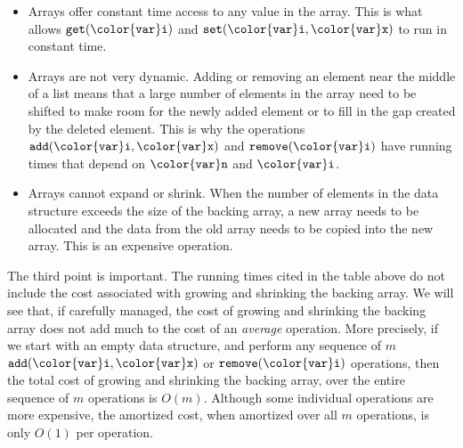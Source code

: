 \documentclass[10pt]{book}
\newcommand{\cpponly}[1]{}\newcommand{\javaonly}[1]{#1}\newcommand{\pcodeonly}[1]{}\newcommand{\notpcode}[1]{#1}\newcommand{\lang}{Java}
\theoremstyle{plain}
\theoremstyle{definition}
\begin{document}
\begin{itemize}
  \item Arrays offer constant time access to any value in the array.
  This is what allows \ensuremath{\mathtt{get({\color{var}i})}} and \ensuremath{\mathtt{set({\color{var}i},{\color{var}x})}} to run in constant time.

  \item Arrays are not very dynamic.  Adding or removing an element
  near the middle of a list means that a large number of elements in the
  array need to be shifted to make room for the newly added element or
  to fill in the gap created by the deleted element.  This is why the
  operations \ensuremath{\mathtt{add({\color{var}i},{\color{var}x})}} and \ensuremath{\mathtt{remove({\color{var}i})}} have running times that depend
  on \ensuremath{\mathtt{{\color{var}n}}} and \ensuremath{\mathtt{{\color{var}i}}}.

  \item Arrays cannot expand or shrink.  When the number of elements in
  the data structure exceeds the size of the backing array, a new array needs
  to be allocated and the data from the old array needs to be copied
  into the new array.  This is an expensive operation.
\end{itemize}
The third point is important.  The running times cited in the table
above do not include the cost associated with growing and shrinking
the backing array.  We will see that, if carefully managed, the cost of
growing and shrinking the backing array does not add much to the cost of
an \emph{average} operation.  More precisely, if we start with an empty
data structure, and perform any sequence of $m$ \ensuremath{\mathtt{add({\color{var}i},{\color{var}x})}} or \ensuremath{\mathtt{remove({\color{var}i})}}
operations, then the total cost of growing and shrinking the backing
array, over the entire sequence of $m$ operations is $O(m)$.  Although
some individual operations are more expensive, the amortized cost,
when amortized over all $m$ operations, is only $O(1)$ per operation.

\cpponly{
In this chapter, and throughout this book, it will be convenient to
have arrays that keep track of their size.  The usual C++ arrays do
not do this, so we have defined a class,  \ensuremath{\mathtt{{\color{var}array}}}, that keeps track
of its length.  The implementation of this class is straightforward.
It is implemented as a standard C++ array, \ensuremath{\mathtt{{\color{var}a}}}, and an integer, \ensuremath{\mathtt{{\color{var}length}}}:}
\cpponly{
The size of an \ensuremath{\mathtt{{\color{var}array}}} is specified at the time of creation:
}
\cpponly{The elements of an array can be indexed:}
\cpponly{Finally, when one array is assigned to another, this is just
a pointer manipulation that takes constant time:}
\end{document}

